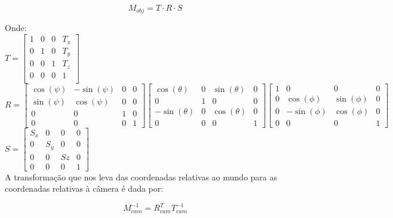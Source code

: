 \documentclass[12pt]{article}
\begin{document}
\boldmath{}
\[
M_{obj} = T \cdot R \cdot S
\]
\unboldmath{}

\noindent
Onde:
\\[\baselineskip]
$T = 
\begin{bmatrix}
    1 & 0 & 0 & T_{x} \\
    0 & 1 & 0 & T_{y} \\
    0 & 0 & 1 & T_{z} \\
    0 & 0 & 0 & 1 \\
\end{bmatrix}$
\\[\baselineskip]
$R =
\begin{bmatrix}
    \cos(\psi) & -\sin(\psi) & 0 & 0 \\ 
    \sin(\psi) &  \cos(\psi) & 0 & 0 \\
    0          &           0 & 1 & 0 \\
    0          &           0 & 0 & 1 
\end{bmatrix}
\begin{bmatrix}
    \cos(\theta)  & 0 &  \sin(\theta) & 0 \\ 
    0             & 1 &            0  & 0 \\
    -\sin(\theta) & 0 &  \cos(\theta) & 0 \\
    0             & 0 &            0  & 1 
\end{bmatrix}
\begin{bmatrix}
    1 & 0           &           0 & 0 \\
    0 &  \cos(\phi) &  \sin(\phi) & 0 \\ 
    0 & -\sin(\phi) &  \cos(\phi) & 0 \\
    0 & 0           &           0 & 1 
\end{bmatrix}
$
\\[\baselineskip]
$ S =
\begin{bmatrix}
    S_{x} & 0 & 0 & 0 \\
    0 & S_{y} & 0 & 0 \\
    0 & 0 & S{z}  & 0 \\
    0 & 0 & 0     & 1
\end{bmatrix}
$
\\[\baselineskip]
A transformação que nos leva das coordenadas relativas ao mundo para as coordenadas relativas à câmera é dada por:

\boldmath{}
\[
M_{cam}^{-1} = R_{cam}^T T_{cam}^{-1}
\]
\unboldmath{}
\end{document}
